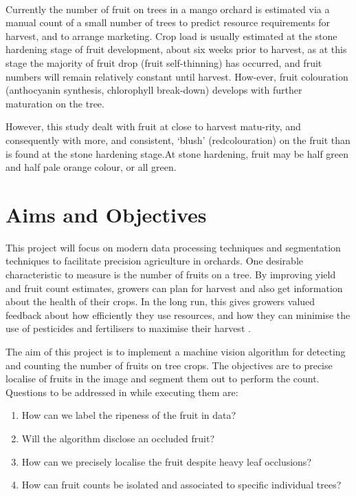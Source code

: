 \documentclass[12pt]{article}
\begin{document}
\\Currently the number of fruit on trees in a mango orchard is estimated via a manual count of a small number of trees to predict resource requirements for harvest, and to arrange marketing. Crop load is usually estimated at the stone hardening stage of fruit development, about six weeks prior to harvest, as at this stage the majority of fruit drop 	(fruit self-thinning) has occurred, and fruit numbers will remain relatively constant until harvest. How-ever, fruit colouration (anthocyanin synthesis, chlorophyll break-down) develops with further maturation on the tree.

However, this study dealt with fruit at close to harvest matu-rity, and consequently with more, and consistent, ‘blush’ (redcolouration) on the fruit than is found at the stone hardening stage.At stone hardening, fruit may be half green and half pale orange colour, or all green.\cite{PAYNE2014160}


\section{Aims and Objectives}
    
This project will focus on modern data processing techniques and segmentation techniques to facilitate precision agriculture in orchards. One desirable characteristic to measure is the number of fruits on a tree. By improving yield and fruit count estimates, growers can plan for harvest and also get information about the health of their crops. In the long run, this gives growers valued feedback about how efficiently they use resources, and how they can minimise the use of pesticides and fertilisers to
maximise their harvest \cite{stein2016improving}.

The aim of this project is to implement a machine vision algorithm for detecting and counting the number of fruits on tree crops. The objectives are to precise localise of fruits in the image and segment them out to perform the count. Questions to be addressed in while executing them are:
\begin{enumerate}
  \item How can we label the ripeness of the fruit in data?
  \item Will the algorithm disclose an occluded fruit?
  \item How can we precisely localise the fruit despite heavy leaf occlusions?
  \item How can fruit counts be isolated and associated to specific individual trees?
\end{enumerate}
\end{document}
